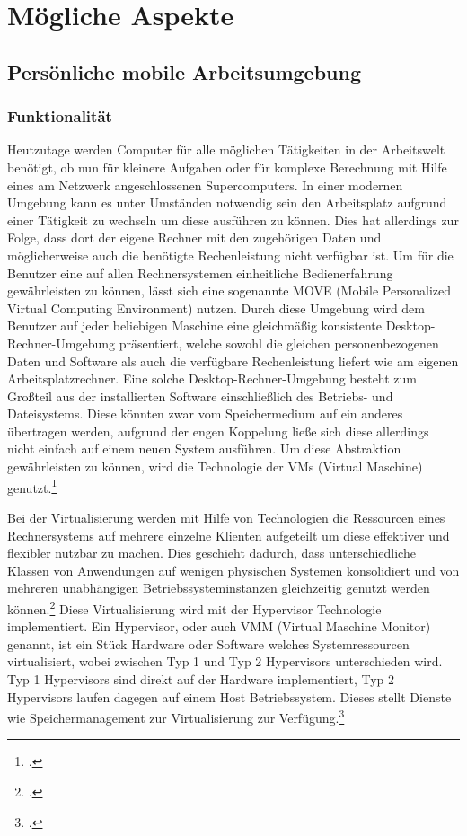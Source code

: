\newpage
\section{Mögliche Aspekte}
\subsection{Persönliche mobile Arbeitsumgebung}
\subsubsection{Funktionalität}
Heutzutage werden Computer für alle möglichen Tätigkeiten in der Arbeitswelt benötigt, ob nun für kleinere Aufgaben oder für komplexe Berechnung mit Hilfe eines am Netzwerk angeschlossenen Supercomputers. In einer modernen Umgebung kann es unter Umständen notwendig sein den Arbeitsplatz aufgrund einer Tätigkeit zu wechseln um diese ausführen zu können. Dies hat allerdings zur Folge, dass dort der eigene Rechner mit den zugehörigen Daten und möglicherweise auch die benötigte Rechenleistung nicht verfügbar ist.
Um für die Benutzer eine auf allen Rechnersystemen einheitliche Bedienerfahrung gewährleisten zu können, lässt sich eine sogenannte MOVE (Mobile Personalized Virtual Computing Environment) nutzen. Durch diese Umgebung wird dem Benutzer auf jeder beliebigen Maschine eine gleichmäßig konsistente Desktop-Rechner-Umgebung präsentiert, welche sowohl die gleichen personenbezogenen Daten und Software als auch die verfügbare Rechenleistung liefert wie am eigenen Arbeitsplatzrechner. Eine solche Desktop-Rechner-Umgebung besteht zum Großteil aus der installierten Software einschließlich des Betriebs- und Dateisystems. Diese könnten zwar vom Speichermedium auf ein anderes übertragen werden, aufgrund der engen Koppelung ließe sich diese allerdings nicht einfach auf einem neuen System ausführen. Um diese Abstraktion gewährleisten zu können, wird die Technologie der VMs (Virtual Maschine) genutzt.\footcite[Vgl.][Seite 890 f.]{MOVE}

Bei der Virtualisierung werden mit Hilfe von Technologien die Ressourcen eines Rechnersystems auf mehrere einzelne Klienten aufgeteilt um diese effektiver und flexibler nutzbar zu machen. Dies geschieht dadurch, dass unterschiedliche Klassen von Anwendungen auf wenigen physischen Systemen konsolidiert und von mehreren unabhängigen Betriebssysteminstanzen gleichzeitig genutzt werden können.\footcite[Vgl.][Seite 197]{InformatikSpektrum} Diese Virtualisierung wird mit der Hypervisor Technologie implementiert. Ein Hypervisor, oder auch VMM (Virtual Maschine Monitor) genannt, ist ein Stück Hardware oder Software welches Systemressourcen virtualisiert, wobei zwischen Typ 1 und Typ 2 Hypervisors unterschieden wird. Typ 1 Hypervisors sind direkt auf der Hardware implementiert, Typ 2 Hypervisors laufen dagegen auf einem Host Betriebssystem. Dieses stellt Dienste wie Speichermanagement zur Virtualisierung zur Verfügung.\footcite[Vgl.][]{ibm}

